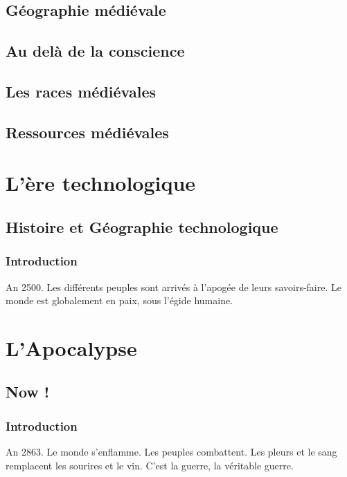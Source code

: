 \documentclass{book}
\makeatletter
\newcommand{\partimage}[2][]{\gdef\@partimage{\texttt{[image: \#2]}}}
\makeatother
\begin{document}
\chapter{Géographie médiévale}

 

\chapter{Au delà de la conscience}




\chapter{Les races médiévales}


\chapter{Ressources médiévales}


\partimage[scale=0.2]{./Ressources/techno/engrenages.jpg}
\part{L'ère technologique}
\chapter{Histoire et Géographie technologique}
\section{Introduction}
An 2500. Les différents peuples sont arrivés à l'apogée de leurs savoirs-faire. Le monde est globalement en paix, sous l'égide humaine.


\part{L'Apocalypse}
\chapter{Now !}
\section{Introduction}
An 2863. Le monde s'enflamme. Les peuples combattent. Les pleurs et le sang remplacent les sourires et le vin. C'est la guerre, la véritable guerre.

\end{document}
